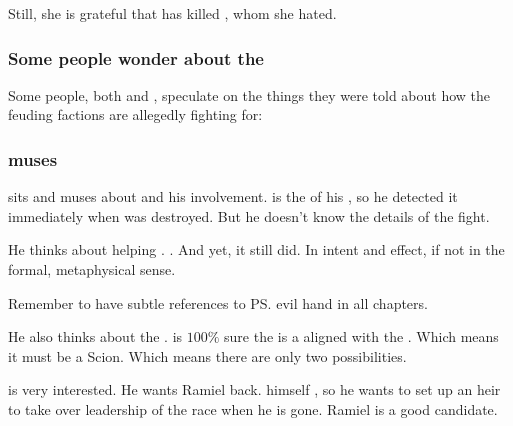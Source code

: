 
Still, she is grateful that \Ishnaruchaefir{} has killed \Teshrial, whom she hated. 





\subsubsection{Some people wonder about the }
Some people, both \human{} and \scathaese{}, speculate on the things they were told about how the feuding factions are allegedly fighting for: 





\subsubsection{\Azraid{} muses}
\Azraid{} sits and muses about \Ishnaruchaefir{} and his involvement. 
\Azraid{} is the \apex{} of his \matrix, so he detected it immediately when \Teshrial{} was destroyed. 
But he doesn't know the details of the fight. 

He thinks about \Ishnaruchaefir{} helping \Secherdamon. 
. 
And yet, it still did. 
In intent and effect, if not in the formal, metaphysical sense. 

Remember to have subtle references to \ps{\Azraid} evil hand in all \Azraid{} chapters. 

\begin{prose}
\end{prose}

He also thinks about the \vertexspike{}. 
\Achsah{} is $100\%$ sure the \vertex{} is a \sathariah{} aligned with the . 
Which means it must be a Scion. 
Which means there are only two possibilities. 

\Azraid{} is very interested. 
He wants Ramiel back. 
\Azraid{} himself , so he wants to set up an heir to take over leadership of the \resphan{} race when he is gone. 
Ramiel is a good candidate. 

